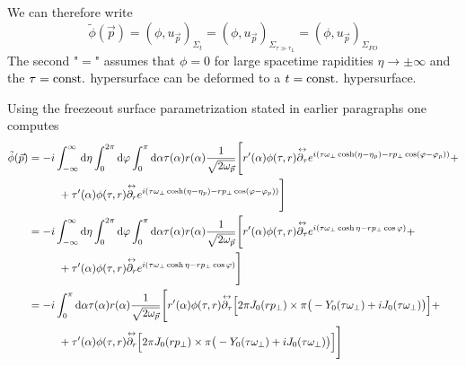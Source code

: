 We can therefore write
\begin{equation}
    \tilde{\phi}(\vec{p})=(\phi,u_{\vec{p}})_{\Sigma_t}=(\phi,u_{\vec{p}})_{\Sigma_{\tau\gg\tau_L}}=(\phi,u_{\vec{p}})_{\Sigma_{FO}}
\end{equation}
The second "$=$" assumes that $\phi=0$ for large spacetime rapidities $\eta\to\pm\infty$ and the $\tau={\text{const.}}$ hypersurface can be deformed to a $t={\text{const.}}$ hypersurface.

Using the freezeout surface parametrization stated in earlier paragraphs one computes
\begin{subequations}
    \begin{align}
        \tilde{\phi}(\vec{p}) & =-\imagu\int_{-\infty}^\infty\dt\eta\int_0^{2\pi}\dt\varphi\int_0^\pi\dt\alpha\tau(\alpha) r(\alpha)\frac{1}{\sqrt{2\omega_{\vec{p}}}}\Bigg[r^\prime(\alpha)\phi(\tau,r)\overset{\leftrightarrow}{\partial_\tau}e^{\imagu(\tau \omega_\perp\cosh(\eta-\eta_p)-r p_\perp\cos(\varphi-\varphi_p))}+\nonumber \\
                              & \phantom{=}\qquad + \tau^\prime(\alpha)\phi(\tau,r)\overset{\leftrightarrow}{\partial_r}e^{\imagu(\tau \omega_\perp\cosh(\eta-\eta_p)-r p_\perp\cos(\varphi-\varphi_p))}\Bigg]                                                                                                                             \\
                              & =-\imagu\int_{-\infty}^\infty\dt\eta\int_0^{2\pi}\dt\varphi\int_0^\pi\dt\alpha\tau(\alpha) r(\alpha)\frac{1}{\sqrt{2\omega_{\vec{p}}}}\Bigg[r^\prime(\alpha)\phi(\tau,r)\overset{\leftrightarrow}{\partial_\tau}e^{\imagu(\tau \omega_\perp\cosh\eta-r p_\perp\cos\varphi)}+\nonumber                      \\
                              & \phantom{=}\qquad + \tau^\prime(\alpha)\phi(\tau,r)\overset{\leftrightarrow}{\partial_r}e^{\imagu(\tau \omega_\perp\cosh\eta-r p_\perp\cos\varphi)}\Bigg]                                                                                                                                                  \\
                              & =-\imagu\int_0^\pi\dt\alpha\tau(\alpha) r(\alpha)\frac{1}{\sqrt{2\omega_{\vec{p}}}}\Bigg[r^\prime(\alpha)\phi(\tau,r)\overset{\leftrightarrow}{\partial_\tau}\Big[2\pi J_0(r p_\perp)\times\pi\big(-Y_0(\tau\omega_\perp)+\imagu J_0(\tau\omega_\perp)\big)\Big]+\nonumber                                 \\
                              & \phantom{=}\qquad + \tau^\prime(\alpha)\phi(\tau,r)\overset{\leftrightarrow}{\partial_r}\Big[2\pi J_0(r p_\perp)\times\pi\big(-Y_0(\tau\omega_\perp)+\imagu J_0(\tau\omega_\perp)\big)\Big]\Bigg]                                                                                                          \\

\end{align}
\end{subequations}
